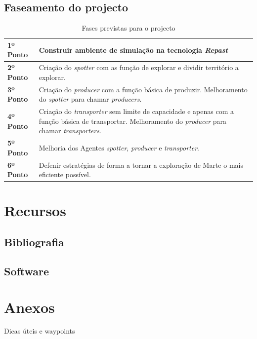 \documentclass[12pt]{report}
\begin{document}
\newpage
\section{Faseamento do projecto}

\begin{table}[htb]
\centering
\caption{Fases previstas para o projecto}
    \sffamily \begin{tabularx}{1.0\textwidth}{ p{3cm}  p{} }
    \hline
    \textbf{1º Ponto} \hfill & Construir ambiente de simulação na tecnologia \emph{Repast} \\ \hline
    \textbf{2º Ponto} \hfill & Criação do \emph{spotter} com as função de explorar e dividir território a explorar. \\ \hline
    \textbf{3º Ponto} \hfill & Criação do \emph{producer} com a função básica de produzir. Melhoramento do \emph{spotter} para chamar \emph{producers}. \\ \hline
    \textbf{4º Ponto} \hfill & Criação do \emph{transporter} sem limite de capacidade e apenas com a função básica de transportar. Melhoramento do \emph{producer} para chamar \emph{transporters}. \\ \hline
    \textbf{5º Ponto} \hfill & Melhoria dos Agentes \emph{spotter}, \emph{producer} e \emph{transporter}. \\ \hline
    \textbf{6º Ponto} \hfill & Defenir estratégias de forma a tornar a exploração de Marte o mais eficiente possível. \\ \hline
    \end{tabularx} \normalfont
\end{table}

\chapter{Recursos}
\section{Bibliografia}
\section{Software}

%
%
\appendix
\renewcommand{\chaptername}{Anexos}
\chapter{Anexos}
Dicas úteis e waypoints
\end{document}
